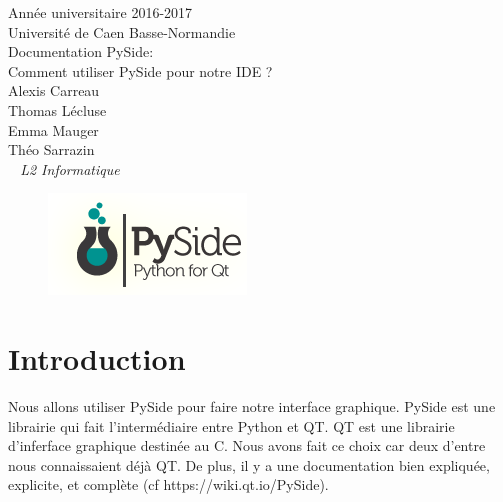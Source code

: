 \documentclass[a4paper,12pt]{article}
\begin{document}
\begin{titlepage}
	\begin{center}
		\Large{Année universitaire 2016-2017}\\
		\Large{Université de Caen Basse-Normandie}\\[1cm]
		
		\huge{Documentation PySide:}\\
		Comment utiliser PySide pour notre IDE ?\\
		\vspace{3cm}
		Alexis Carreau\\
		Thomas Lécluse\\
		Emma Mauger\\
		Théo Sarrazin\\
	\normalsize{\textit{ ~ L2 Informatique}}\\
		\medskip
		\vspace{4cm}

	\begin{figure}[!h]

			\begin{center}

				\includegraphics[scale=1]{"images/Pysidelogo"}

			\end{center}

	\end{figure}
		
	\end{center}
\end{titlepage}


\tableofcontents

\newpage

\section{Introduction}

Nous allons utiliser PySide pour faire notre interface graphique. PySide est une librairie qui fait l'intermédiaire entre Python et QT. QT est une librairie d'inferface graphique destinée au C. Nous avons fait ce choix car deux d'entre nous connaissaient déjà QT. De plus, il y a une documentation bien expliquée, explicite, et complète (cf https://wiki.qt.io/PySide). 
\end{document}
